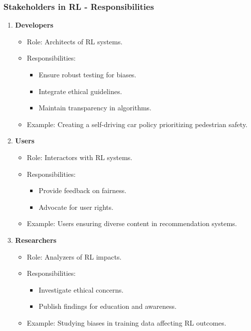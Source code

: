 \documentclass[aspectratio=169]{beamer}
\begin{document}
\begin{frame}[fragile]
    \frametitle{Stakeholders in RL - Responsibilities}
    \begin{enumerate}
        \item \textbf{Developers}
            \begin{itemize}
                \item Role: Architects of RL systems.
                \item Responsibilities:
                    \begin{itemize}
                        \item Ensure robust testing for biases.
                        \item Integrate ethical guidelines.
                        \item Maintain transparency in algorithms.
                    \end{itemize}
                \item Example: Creating a self-driving car policy prioritizing pedestrian safety.
            \end{itemize}
        
        \item \textbf{Users}
            \begin{itemize}
                \item Role: Interactors with RL systems.
                \item Responsibilities:
                    \begin{itemize}
                        \item Provide feedback on fairness.
                        \item Advocate for user rights.
                    \end{itemize}
                \item Example: Users ensuring diverse content in recommendation systems.
            \end{itemize}

        \item \textbf{Researchers}
            \begin{itemize}
                \item Role: Analyzers of RL impacts.
                \item Responsibilities:
                    \begin{itemize}
                        \item Investigate ethical concerns.
                        \item Publish findings for education and awareness.
                    \end{itemize}
                \item Example: Studying biases in training data affecting RL outcomes.
            \end{itemize}
    \end{enumerate}
\end{frame}
\end{document}

